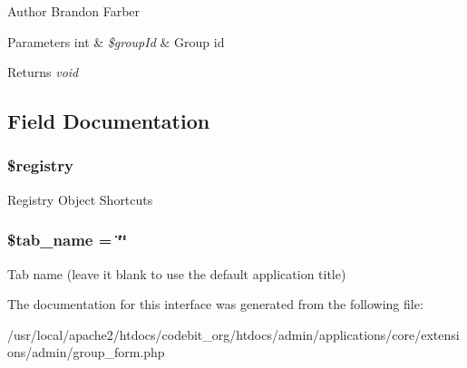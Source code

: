 \begin{DoxyAuthor}{Author}
Brandon Farber 
\end{DoxyAuthor}

\begin{DoxyParams}[1]{Parameters}
int & {\em \$group\-Id} & Group id \\
\hline
\end{DoxyParams}
\begin{DoxyReturn}{Returns}
{\itshape void} 
\end{DoxyReturn}


\subsection{Field Documentation}
\hypertarget{classadmin__group__form____core_a531e4a386aaa7f3e06d3642dc38d7e80}{
\subsubsection[{\$registry}]{\setlength{\rightskip}{0pt plus 5cm}\$registry\hspace{0.3cm}{\ttfamily [protected]}}}\label{classadmin__group__form____core_a531e4a386aaa7f3e06d3642dc38d7e80}
Registry Object Shortcuts \hypertarget{classadmin__group__form____core_a924f0502d852ff2259cef00e4fa12d94}{
\subsubsection[{\$tab\-\_\-name}]{\setlength{\rightskip}{0pt plus 5cm}\$tab\-\_\-name = \char`\"{}\char`\"{}}}\label{classadmin__group__form____core_a924f0502d852ff2259cef00e4fa12d94}
Tab name (leave it blank to use the default application title) 

The documentation for this interface was generated from the following file\-:\begin{DoxyCompactItemize}
\item 
/usr/local/apache2/htdocs/codebit\-\_\-org/htdocs/admin/applications/core/extensions/admin/group\-\_\-form.\-php\end{DoxyCompactItemize}
